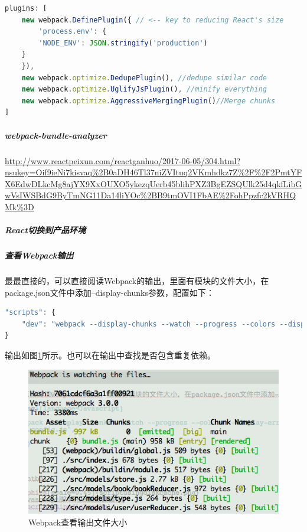 \documentclass[letter]{book}
\begin{document}
\begin{lstlisting}[language=Javascript]
plugins: [
	new webpack.DefinePlugin({ // <-- key to reducing React's size
		'process.env': {
		'NODE_ENV': JSON.stringify('production')
	}
	}),
	new webpack.optimize.DedupePlugin(), //dedupe similar code 
	new webpack.optimize.UglifyJsPlugin(), //minify everything
	new webpack.optimize.AggressiveMergingPlugin()//Merge chunks 
]
\end{lstlisting}

\subparagraph{webpack-bundle-analyzer}

\url{http://www.reactpeixun.com/reactganhuo/2017-06-05/304.html?nsukey=Oif9ieNi7kisvaq%2B0aDH46Tl37niZVItuq2VKmhdkz7Z%2F%2F2PmtYFX6EdwDLkcMg8ajYX9XxOUXO5ykezqUerb45blihPXZ3BgEZSQUlk25d4qkfLibGwVsIWSBdG9ByTmNG11Da14liYOc%2BB9tmOVI1FbAE%2FohPpzfc2kVRHQMk%3D}

\subparagraph{React切换到产品环境}

\subparagraph{查看Webpack输出}

最最直接的，可以直接阅读Webpack的输出，里面有模块的文件大小，在package.json文件中添加--display-chunks参数，配置如下：

\begin{lstlisting}[language=Javascript]
"scripts": {
	"dev": "webpack --display-chunks --watch --progress --colors --display-error-details --config webpack/dev.config.js",
}
\end{lstlisting}


输出如图\ref{fig:webpackcheckingfilesize}所示。也可以在输出中查找是否包含重复依赖。

\begin{figure}[htbp]
	\centering
	\includegraphics[scale=0.7]{webpackcheckingfilesize.png}
	\caption{Webpack查看输出文件大小}
	\label{fig:webpackcheckingfilesize}
\end{figure}
\end{document}
